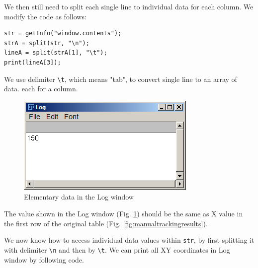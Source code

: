 \documentclass[11pt,a4paper,oneside]{report}
\newcommand{\ilcom}[1]{\texttt{\small#1}}
\begin{document}
We then still need to split each single line to individual data for each column. We modify the code as follows:
\begin{lstlisting}[numbers=none, morekeywords={*, split}]
str = getInfo("window.contents");
strA = split(str, "\n");
lineA = split(strA[1], "\t");
print(lineA[3]);
\end{lstlisting}

We use delimiter \ilcom{\textbackslash{}t}, which means "tab", to convert single line to an array of data. each for a column. 
\begin{figure}[htbp]
\begin{center}
\includegraphics[scale=0.6]{fig/fig253_XfirstlineValue.png}
\caption{Elementary data in the Log window}
\label{fig:doublesplittedLine}
\end{center}
\end{figure}

The value shown in the Log window (Fig. \ref{fig:doublesplittedLine}) 
should be the same as X value in the first row of the original table (Fig. \ref{fig:manualtrackingresults}). 

We now know how to access individual data values within \ilcom{str}, 
by first splitting it with delimiter  \ilcom{\textbackslash{}n} and then by  
\ilcom{\textbackslash{}t}. We can print all XY coordinates in Log window by following code.  


\end{document}
